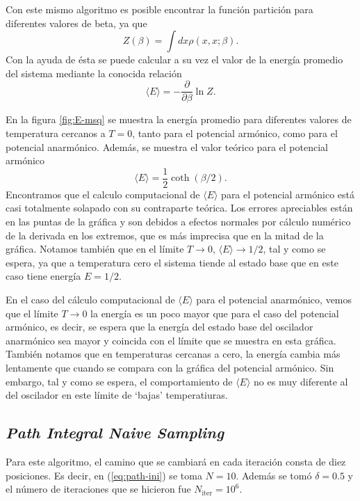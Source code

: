 \documentclass[%
 reprint,
 amsmath,amssymb,
 aps,
 pra,
]{revtex4-2}
\begin{document}
Con este mismo algoritmo es posible encontrar la función partición para diferentes valores de beta, ya que
\begin{equation}
	Z(\beta) = \int dx \rho(x,x;\beta).
\end{equation}
Con la ayuda de ésta se puede calcular a su vez el valor de la energía promedio del sistema mediante la conocida relación
\begin{equation}
	\langle E \rangle=-\frac{\partial}{ \partial \beta} \ln Z.
\end{equation}

En la figura \ref{fig:E-msq} se muestra la energía promedio para diferentes valores de temperatura cercanos a $T=0$, tanto para el potencial armónico, como para el potencial anarmónico. Además, se muestra el valor teórico para el potencial armónico
\begin{equation}
	\langle E \rangle = \frac{1}{2}\coth(\beta/2). \label{eq:Energ-prom}
\end{equation}
Encontramos que el calculo computacional de $\langle E \rangle$ para el potencial armónico está casi totalmente solapado con su contraparte teórica. Los errores apreciables están en las puntas de la gráfica y son debidos a efectos normales por cálculo numérico de la derivada en los extremos, que es más imprecisa que en la mitad de la gráfica. Notamos también que en el límite $T \rightarrow 0$, $\langle E \rangle\rightarrow 1/2$, tal y como se espera, ya que a temperatura cero el sistema tiende al estado base que en este caso tiene energía $E = 1/2$.

En el caso del cálculo computacional de  $\langle E \rangle$ para el potencial anarmónico, vemos que el límite $T \rightarrow 0$ la energía es un poco mayor que para el caso del potencial armónico, es decir, se espera que la energía del estado base del oscilador anarmónico sea mayor y coincida con el límite que se muestra en esta gráfica. También notamos que en temperaturas cercanas a cero, la energía cambia más lentamente que cuando se compara con la gráfica del potencial armónico. Sin embargo, tal y como se espera, el comportamiento de $\langle E \rangle$ no es muy diferente al del oscilador en este límite de `bajas' temperatiuras.




\subsection{\textit{Path Integral Naive Sampling}}


Para este algoritmo, el camino que se cambiará en cada iteración consta de diez posiciones. Es decir, en (\ref{eq:path-ini}) se toma $N=10$. Además se tomó $\delta = 0.5$ y el número de iteraciones que se hicieron fue $N_\mathrm{iter}=10^6$.
\end{document}
